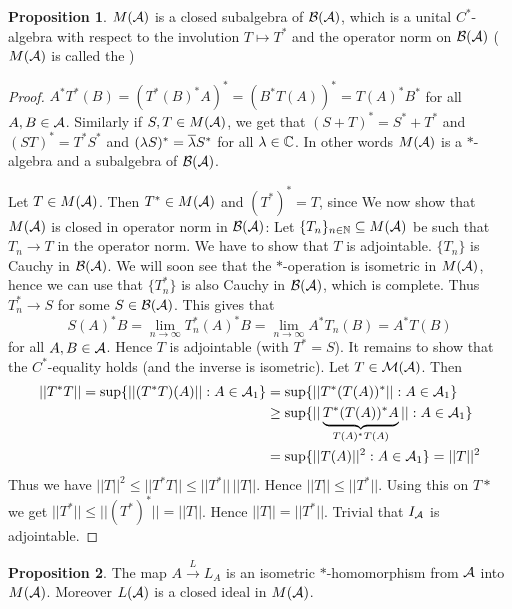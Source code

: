 \documentclass[10pt,english,a4paper]{article}
\theoremstyle{definition}
\newtheorem*{proposition}{Proposition}
\let\emph\relax %
\begin{document}
\begin{proposition}
    $M(\mathcal{A})$ is a closed subalgebra of $\mathcal{B}(\mathcal{A})$, which is a unital $C^*$-algebra 
with respect to the involution $T \mapsto T^*$ and the operator norm on $\mathcal{B}(\mathcal{A})$
($M(\mathcal{A})$ is called the \emph{Multiplier algebra of $\As$})
\end{proposition}
\begin{proof}
$A^*T^*(B) = (T^*(B)^* A)^* = (B^*T(A))^* = T(A)^*B^*$ for all $A,B\in \mathcal{A}$.
Similarly if $S,T \in M(\mathcal{A})$, we get that $(S+T)^* = S^* + T^*$ and 
$(ST)^* = T^*S^*$ and $(\lambda S)^* = \overline{\lambda}S^*$ for all $\lambda \in \mathbb{C}$.
In other words $M(\mathcal{A})$ is a $*$-algebra and a subalgebra of $\mathcal{B}(\mathcal{A})$.

Let $T \in M(\mathcal{A})$. Then $T^* \in M(\mathcal{A})$ and $(T^*)^* = T$, since 
We now show that $M(\mathcal{A})$ is  closed in operator norm in $\mathcal{B}(\mathcal{A})$:
Let $\{T_n\}_{n\in \mathbb{N}} \subseteq M(\mathcal{A})$ be such that $T_n \to T$ in the operator norm. 
We have to show that $T$ is adjointable. $\{T_n\}$ is Cauchy in $\mathcal{B}(\mathcal{A})$. We will
soon see that the $*$-operation is isometric in $M(\mathcal{A})$, hence we can use 
that $\{T_{n}^{*}\}$ is also Cauchy in $\mathcal{B}(\mathcal{A})$, which is complete. Thus 
$T_{n}^* \to S$ for some $S \in \mathcal{B}(\mathcal{A})$. This gives that 
\[S(A)^*B 
=\lim_{n\to\infty} T_{n}^{*}(A)^*B 
=\lim_{n\to\infty} A^*T_{n}(B) 
= A^*T(B)
\]
for all $A,B \in \mathcal{A}$. Hence $T$ is adjointable (with $T^* = S$). 
It remains to show that the $C^*$-equality holds (and the inverse is
isometric). Let $T \in \mathcal{M}(\mathcal{A})$. Then 
\begin{align*}
||T^*T || = \sup \{ ||(T^*T)(A) || : A \in \mathcal{A}_1\}
&=  \sup \{ ||T^*(T(A))^* || : A \in \mathcal{A}_1\}  \\
&\geq \sup\{ ||\underbrace{T^*(T(A))^*A}_{T(A)^*T(A)} || : A\in \mathcal{A}_1 \} \\
&= \sup\{ ||T(A)||^2 : A \in \mathcal{A}_1 \} = ||T||^2 
\end{align*}
Thus we have $||T||^2 \leq ||T^*T|| \leq ||T^*||\,||T||$.
Hence $||T|| \leq ||T^*||$. Using this on $T*$ we get $||T^*|| \leq ||(T^*)^*|| = ||T||$.
Hence $||T|| = ||T^*||$. Trivial that $I_{\mathcal{A}}$ is adjointable. 

\end{proof}

\begin{proposition}
    The map $A \overset{L}{\to} L_A$ is an isometric $*$-homomorphism from 
$\As$ into $M(\mathcal{A})$. Moreover $L(\mathcal{A})$ is a closed ideal in $M(\mathcal{A})$.
\end{proposition}
\end{document}

